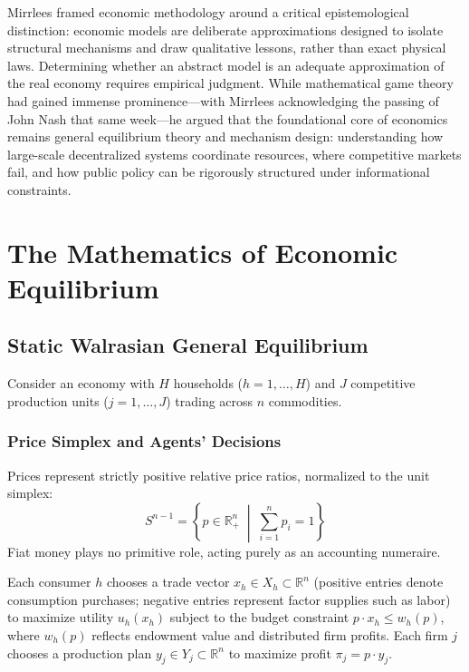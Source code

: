 \documentclass[11pt,a4paper]{article}
\begin{document}
Mirrlees framed economic methodology around a critical epistemological distinction: economic models are deliberate approximations designed to isolate structural mechanisms and draw qualitative lessons, rather than exact physical laws. Determining whether an abstract model is an adequate approximation of the real economy requires empirical judgment. While mathematical game theory had gained immense prominence---with Mirrlees acknowledging the passing of John Nash that same week---he argued that the foundational core of economics remains general equilibrium theory and mechanism design: understanding how large-scale decentralized systems coordinate resources, where competitive markets fail, and how public policy can be rigorously structured under informational constraints.

\section{The Mathematics of Economic Equilibrium}

\subsection{Static Walrasian General Equilibrium}
Consider an economy with $H$ households ($h = 1, \dots, H$) and $J$ competitive production units ($j = 1, \dots, J$) trading across $n$ commodities.

\subsubsection{Price Simplex and Agents' Decisions}
Prices represent strictly positive relative price ratios, normalized to the unit simplex:
\begin{equation}
S^{n-1} = \left\{ p \in \mathbb{R}^n_+ \;\middle|\; \sum_{i=1}^n p_i = 1 \right\}
\end{equation}
Fiat money plays no primitive role, acting purely as an accounting numeraire. 

Each consumer $h$ chooses a trade vector $x_h \in X_h \subset \mathbb{R}^n$ (positive entries denote consumption purchases; negative entries represent factor supplies such as labor) to maximize utility $u_h(x_h)$ subject to the budget constraint $p \cdot x_h \le w_h(p)$, where $w_h(p)$ reflects endowment value and distributed firm profits. Each firm $j$ chooses a production plan $y_j \in Y_j \subset \mathbb{R}^n$ to maximize profit $\pi_j = p \cdot y_j$.
\end{document}
